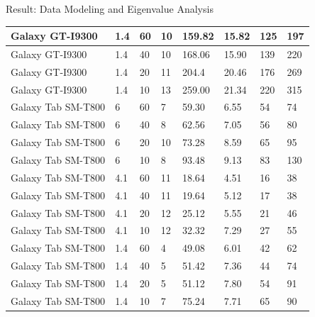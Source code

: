 \documentclass[newPxFont, numfooter, sectionpages]{beamer}
\begin{document}
\begin{frame}[c]{Result: Data Modeling and Eigenvalue Analysis}
\begin{table}
\begin{tabular}{|l|l|l|l|l|l|l|l|}
			Galaxy GT-I9300	& 1.4	& 60	& 10	& 159.82	& 15.82	& 125	& 197	\\ \hline
			Galaxy GT-I9300	& 1.4	& 40	& 10	& 168.06	& 15.90	& 139	& 220	\\ \hline
			Galaxy GT-I9300	& 1.4	& 20	& 11	& 204.4	& 20.46	& 176	& 269	\\ \hline
			Galaxy GT-I9300	& 1.4	& 10	& 13	& 259.00	& 21.34	& 220	& 315	\\ \hline
			Galaxy Tab SM-T800	& 6	& 60	& 7	& 59.30	& 6.55	& 54	& 74	\\ \hline
			Galaxy Tab SM-T800	& 6	& 40	& 8	& 62.56	& 7.05	& 56	& 80	\\ \hline
			Galaxy Tab SM-T800	& 6	& 20	& 10	& 73.28	& 8.59	& 65	& 95	\\ \hline
			Galaxy Tab SM-T800	& 6	& 10	& 8	& 93.48	& 9.13	& 83	& 130	\\ \hline
			Galaxy Tab SM-T800	& 4.1	& 60	& 11	& 18.64	& 4.51	& 16	& 38	\\ \hline
			Galaxy Tab SM-T800	& 4.1	& 40	& 11	& 19.64	& 5.12	& 17	& 38	\\ \hline
			Galaxy Tab SM-T800	& 4.1	& 20	& 12	& 25.12	& 5.55	& 21	& 46	\\ \hline
			Galaxy Tab SM-T800	& 4.1	& 10	& 12	& 32.32	& 7.29	& 27	& 55	\\ \hline
			Galaxy Tab SM-T800	& 1.4	& 60	& 4	& 49.08	& 6.01	& 42	& 62	\\ \hline
			Galaxy Tab SM-T800	& 1.4	& 40	& 5	& 51.42	& 7.36	& 44	& 74	\\ \hline
			Galaxy Tab SM-T800	& 1.4	& 20	& 5	& 51.12	& 7.80	& 54	& 91	\\ \hline
			Galaxy Tab SM-T800	& 1.4	& 10	& 7	& 75.24	& 7.71	& 65	& 90	\\ \hline
		\end{tabular}
	\end{table}
	
\end{frame}
\end{document}
